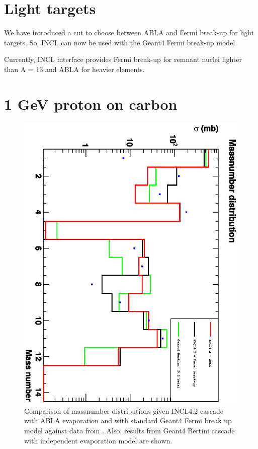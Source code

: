 \documentclass[a4paper]{jpconf}
\begin{document}
\section{Light targets}

We have introduced a cut to choose between ABLA and Fermi break-up for light targets.
So, INCL can now be used with the Geant4 Fermi break-up model.


Currently, INCL interface provides Fermi break-up \cite{g4incl} for
remnant nuclei lighter than A = 13 and ABLA for heavier elements.

\section{1 GeV proton  on carbon}
\begin{figure}
\includegraphics[scale=0.60,angle=90]{poster/images/masses.eps}
\caption{Comparison of massnumber distributions given INCL4.2 cascade with ABLA evaporation 
and with standard Geant4 Fermi break up model against data from \cite{a}.
Also, results from Geant4 Bertini cascade with independent evaporation model are shown. }
\end{figure}
\end{document}
